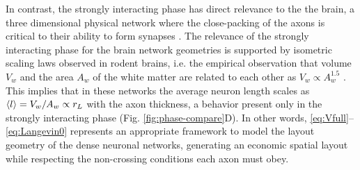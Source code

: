 \documentclass[nofootinbib,preprint,floatfix,titlepage,endfloats,superscriptaddress]{revtex4} %
\begin{document}
In contrast, the strongly interacting phase has direct relevance to the the brain, a three dimensional physical network where the close-packing of the axons is critical to their ability to form synapses \cite{stepanyants2002geometry,rivera2011wiring}. 
The relevance of the strongly interacting phase for the brain network geometries 
\cite{azevedo2009equal, herculano2012remarkable, herculano2014brain}
is supported by isometric scaling laws observed in rodent brains, i.e. the empirical observation that volume $V_w$ and the area $A_w$ of the white matter  are related to each other as $V_w\propto A_w^{1.5}$ \cite{herculano2012remarkable}. 
This implies that in these networks the average neuron length scales as $ \left<l\right> = V_w/A_w \propto r_L $ with the axon thickness, a behavior present only in the strongly interacting phase %
(Fig. \ref{fig:phase-compare}D). 
In other words,  \eqref{eq:Vfull}--\eqref{eq:Langevin0} represents an appropriate framework to model the layout geometry of the dense neuronal networks, generating an economic spatial layout \cite{bullmore2012economy,sporns2004organization,kotter2001connectional} while respecting the non-crossing conditions each axon must obey.

\end{document}
